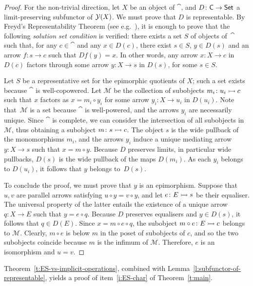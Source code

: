\documentclass[a4paper,10pt,reqno]{amsart}
\theoremstyle{definition}
\theoremstyle{remark}
\begin{document}
\begin{proof}
For the non-trivial direction, let $X$ be an object of $\cat$, and $D\colon {\sf C}\to{\sf Set}$ a limit-preserving subfunctor of $\mathcal{Y}(X)$. We must prove that $D$ is representable. By Freyd's Representability Theorem (see e.g.\ \cite[Theorem~4.6.15]{Riehl2016book}), it is enough to prove that the following \emph{solution set condition} is verified: there exists a set $S$ of objects of~$\cat$ such that, for any $c\in \cat$ and any $x\in D(c)$, there exist $s\in S$, $y\in D(s)$ and an arrow $f\colon s\to c$ such that $Df(y)=x$. In other words, any arrow $x\colon X\to c$ in $D(c)$ factors through some arrow $y\colon X\to s$ in $D(s)$, for some $s\in S$.

Let $S$ be a representative set for the epimorphic quotients of $X$; such a set exists because $\cat$ is well-copowered. Let $\mathcal{M}$ be the collection of subobjects $m_i\colon u_i \rightarrowtail c$ such that $x$ factors as $x=m_i\circ y_i$ for some arrow $y_i\colon X\to u_i$ in $D(u_i)$. Note that~$\mathcal{M}$ is a set because $\cat$ is well-powered, and the arrows $y_i$ are necessarily unique.
%
Since $\cat$ is complete, we can consider the intersection of all subobjects in $\mathcal{M}$, thus obtaining a subobject $m\colon s\rightarrowtail c$. The object $s$ is the wide pullback of the monomorphisms $m_i$, and the arrows $y_i$ induce a unique mediating arrow $y\colon X\to s$ such that $x = m\circ y$. Because $D$ preserves limits, in particular wide pullbacks, $D(s)$ is the wide pullback of the maps $D(m_i)$. As each $y_i$ belongs to $D(u_i)$, it follows that $y$ belongs to~$D(s)$.

To conclude the proof, we must prove that $y$ is an epimorphism. Suppose that $u,v$ are parallel arrows satisfying $u\circ y = v\circ y$, and let $e\colon E \rightarrowtail s$ be their equaliser. The universal property of the latter entails the existence of a unique arrow $q\colon X\to E$ such that $y = e\circ q$. Because $D$ preserves equalisers and $y\in D(s)$, it follows that $q\in D(E)$. Since $x = m\circ e \circ q$, the subobject $m\circ e\colon E \rightarrowtail c$ belongs to $\mathcal{M}$. Clearly, $m\circ e$ is below $m$ in the poset of subobjects of $c$, and so the two subobjects coincide because $m$ is the infimum of $\mathcal{M}$. Therefore, $e$ is an isomorphism and $u=v$.
\end{proof}

Theorem~\ref{t:ES-vs-implicit-operations}, combined with Lemma~\ref{l:subfunctor-of-representable}, yields a proof of item~\ref{i:ES-char} of Theorem~\ref{t:main}.
\end{document}

